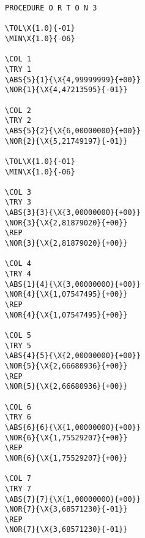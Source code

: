 
\small%
\begin{Verbatim}[commandchars=\\\{\},codes={\catcode`$=3\catcode`_=8}]
PROCEDURE O R T O N 3

\TOL\X{1.0}{-01}
\MIN\X{1.0}{-06}

\COL 1
\TRY 1
\ABS{5}{1}{\X{4,99999999}{+00}}
\NOR{1}{\X{4,47213595}{-01}}

\COL 2
\TRY 2
\ABS{5}{2}{\X{6,00000000}{+00}}
\NOR{2}{\X{5,21749197}{-01}}

\TOL\X{1.0}{-01}
\MIN\X{1.0}{-06}

\COL 3
\TRY 3
\ABS{3}{3}{\X{3,00000000}{+00}}
\NOR{3}{\X{2,81879020}{+00}}
\REP
\NOR{3}{\X{2,81879020}{+00}}

\COL 4
\TRY 4
\ABS{1}{4}{\X{3,00000000}{+00}}
\NOR{4}{\X{1,07547495}{+00}}
\REP
\NOR{4}{\X{1,07547495}{+00}}

\COL 5
\TRY 5
\ABS{4}{5}{\X{2,00000000}{+00}}
\NOR{5}{\X{2,66680936}{+00}}
\REP
\NOR{5}{\X{2,66680936}{+00}}

\COL 6
\TRY 6
\ABS{6}{6}{\X{1,00000000}{+00}}
\NOR{6}{\X{1,75529207}{+00}}
\REP
\NOR{6}{\X{1,75529207}{+00}}

\COL 7
\TRY 7
\ABS{7}{7}{\X{1,00000000}{+00}}
\NOR{7}{\X{3,68571230}{-01}}
\REP
\NOR{7}{\X{3,68571230}{-01}}
\end{Verbatim}
%

